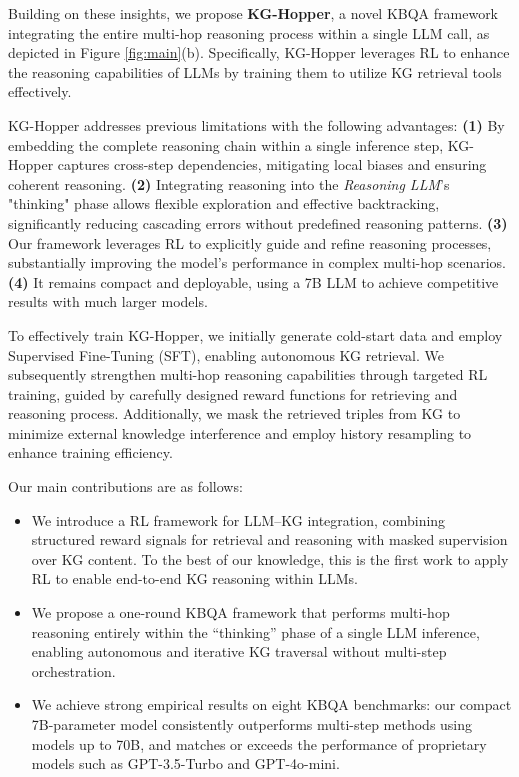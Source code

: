 \documentclass[10pt,conference]{IEEEtran}
\begin{document}
Building on these insights, we propose \textbf{KG-Hopper}, a novel KBQA framework integrating the entire multi-hop reasoning process within a single LLM call, as depicted in Figure \ref{fig:main}(b). Specifically, KG-Hopper leverages RL to enhance the reasoning capabilities of LLMs by training them to utilize KG retrieval tools effectively.

KG-Hopper addresses previous limitations with the following advantages:
\textbf{(1)} By embedding the complete reasoning chain within a single inference step, KG-Hopper captures cross-step dependencies, mitigating local biases and ensuring coherent reasoning.
\textbf{(2)} Integrating reasoning into the \textit{Reasoning LLM}'s "thinking" phase allows flexible exploration and effective backtracking, significantly reducing cascading errors without predefined reasoning patterns.
\textbf{(3)} Our framework leverages RL to explicitly guide and refine reasoning processes, substantially improving the model’s performance in complex multi-hop scenarios.
\textbf{(4)} It remains compact and deployable, using a 7B LLM to achieve competitive results with much larger models.

To effectively train KG-Hopper, we initially generate cold-start data and employ Supervised Fine-Tuning (SFT), enabling autonomous KG retrieval. We subsequently strengthen multi-hop reasoning capabilities through targeted RL training, guided by carefully designed reward functions for retrieving and reasoning process. Additionally, we mask the retrieved triples from KG to minimize external knowledge interference and employ history resampling to enhance training efficiency.

Our main contributions are as follows:
\begin{itemize}[leftmargin=1.5em]

\item We introduce a RL framework for LLM–KG integration, combining structured reward signals for retrieval and reasoning with masked supervision over KG content. To the best of our knowledge, this is the first work to apply RL to enable end-to-end KG reasoning within LLMs.

\item We propose a one-round KBQA framework that performs multi-hop reasoning entirely within the “thinking” phase of a single LLM inference, enabling autonomous and iterative KG traversal without multi-step orchestration.

\item We achieve strong empirical results on eight KBQA benchmarks: our compact 7B-parameter model consistently outperforms multi-step methods using models up to 70B, and matches or exceeds the performance of proprietary models such as GPT-3.5-Turbo and GPT-4o-mini.
\end{itemize}
\end{document}
